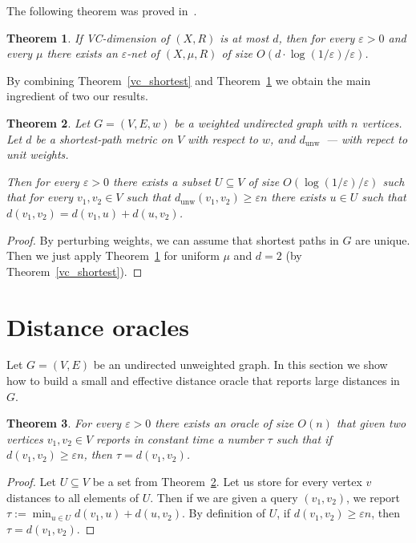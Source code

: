 \documentclass[12pt]{article}
\newcommand{\dunw}{d_{\mathrm{unw}}}
\newcommand{\eps}{\varepsilon}
\newtheorem{theorem}{Theorem}
\begin{document}
    The following theorem was proved in~\cite{HW86}.

    \begin{theorem}
        \label{eps_nets}
        If VC-dimension of $(X, R)$ is at most $d$, then for every $\eps > 0$ and every $\mu$ there exists an $\eps$-net of $(X, \mu, R)$ of size 
        $O(d \cdot \log(1 / \eps) / \eps)$.
    \end{theorem}

    By combining Theorem~\ref{vc_shortest} and Theorem~\ref{eps_nets} we obtain the main ingredient of two our results.

    \begin{theorem}
        \label{hitting_set}
        Let $G = (V, E, w)$ be a weighted undirected graph with $n$ vertices.
        Let $d$ be a shortest-path metric on $V$ with respect to $w$, and $\dunw$~--- with repect to unit weights.

        Then for every $\eps > 0$ there exists a subset $U \subseteq V$ of size $O(\log(1 / \eps) / \eps)$
        such that for every $v_1, v_2 \in V$ such that $\dunw(v_1, v_2) \geq \eps n$
        there exists $u \in U$ such that $d(v_1, v_2) = d(v_1, u) + d(u, v_2)$.
    \end{theorem}
    \begin{proof}
        By perturbing weights, we can assume that shortest paths in $G$ are unique. Then we just apply Theorem~\ref{eps_nets} for uniform $\mu$
        and $d = 2$ (by Theorem~\ref{vc_shortest}).
    \end{proof}

    \section{Distance oracles}
    \label{data_structure}

    Let $G = (V, E)$ be an undirected unweighted graph. In this section we show how to build a small and effective distance oracle 
    that reports large distances in $G$.

    \begin{theorem}
        \label{simple_oracle}
        For every $\eps > 0$
        there exists an oracle of size $O(n)$ that given two vertices $v_1, v_2 \in V$ reports in constant time
        a number $\tau$ such that if $d(v_1, v_2) \geq \eps n$, then
        $\tau = d(v_1, v_2)$.
    \end{theorem}
    \begin{proof}
        Let $U \subseteq V$ be a set from Theorem~\ref{hitting_set}.
        Let us store for every vertex $v$ distances to all elements of $U$.
        Then if we are given a query $(v_1, v_2)$, we report $\tau := \min_{u \in U} d(v_1, u) + d(u, v_2)$. By definition of $U$, if $d(v_1, v_2) \geq \eps n$,
        then $\tau = d(v_1, v_2)$.
    \end{proof}
\end{document}
